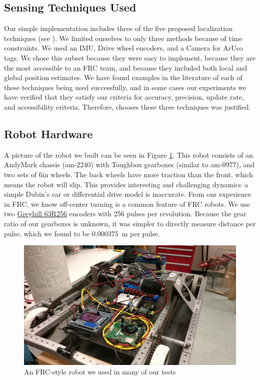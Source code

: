 \documentclass{article}
\newcommand{\Newnameref}[1]{\textit{\nameref{#1}}}
\begin{document}
  \subsection{Sensing Techniques Used}\label{section:techniques_used}

    Our simple implementation includes three of the five proposed localization techniques (see \Newnameref{section:proposed_techniques}). We limited ourselves to only three methods because of time constraints. We used an IMU, Drive wheel encoders, and a Camera for ArUco tags. We chose this subset because they were easy to implement, because they are the most accessible to an FRC team, and because they included both local and global position estimates. We have found examples in the literature of each of these techniques being used successfully, and in some cases our experiments we have verified that they satisfy our criteria for accuracy, precision, update rate, and accessibility criteria. Therefore, chooses these three techniques was justified.

	\subsection{Robot Hardware}

    A picture of the robot we built can be seen in Figure \ref{fig:mocap_robot}. This robot consists of an AndyMark chassis (am-2240) with Toughbox gearboxes (similar to am-0977), and two sets of 6in wheels. The back wheels have more traction than the front, which means the robot will slip. This provides interesting and challenging dynamics--a simple Dubin's car or differential drive model is inaccurate. From our experience in FRC, we know off-center turning is a common feature of FRC robots. We use two \href{https://www.digikey.com/product-detail/en/grayhill-inc/63R256/GH3070-ND/304479}{Greyhill 63R256} encoders with 256 pulses per revolution. Because the gear ratio of our gearboxes is unknown, it was simpler to directly measure distance per pulse, which we found to be \SI{0.000375}{\meter} per pulse.

    \begin{figure}[H]
      \centering
      \includegraphics[width=1\linewidth]{./images/mocap_robot.jpg}
      \caption{An FRC-style robot we used in many of our tests}
      \label{fig:mocap_robot}
    \end{figure}
\end{document}
